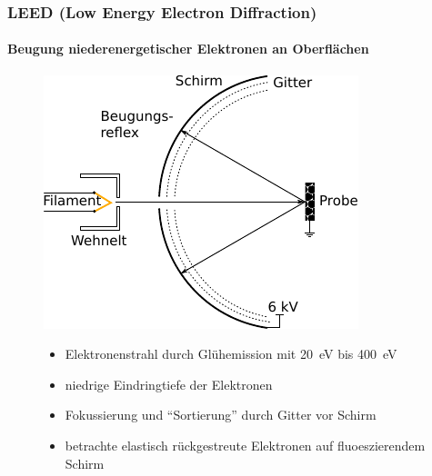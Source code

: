 \documentclass{beamer}
\begin{document}
\begin{frame}
\frametitle{LEED (Low Energy Electron Diffraction)}
\framesubtitle{Beugung niederenergetischer Elektronen an Oberflächen}
\begin{figure}[htbp]
	\begin{minipage}[b]{0.45\textwidth}
		\includegraphics[]{bilder/leedkleiner}
	\end{minipage}
	\hspace{0.4cm}
	\begin{minipage}[b]{0.45\textwidth}
		\begin{itemize}
 		\item Elektronenstrahl durch Glühemission mit \SI{20}{eV} bis \SI{400}{eV}
 	 	\item niedrige Eindringtiefe der Elektronen
 	 	\item Fokussierung und "`Sortierung"' durch Gitter vor Schirm
 	 	\item betrachte elastisch rückgestreute Elektronen auf fluoeszierendem Schirm
		\end{itemize}
	\end{minipage}
\end{figure}
\end{frame}
\end{document}
